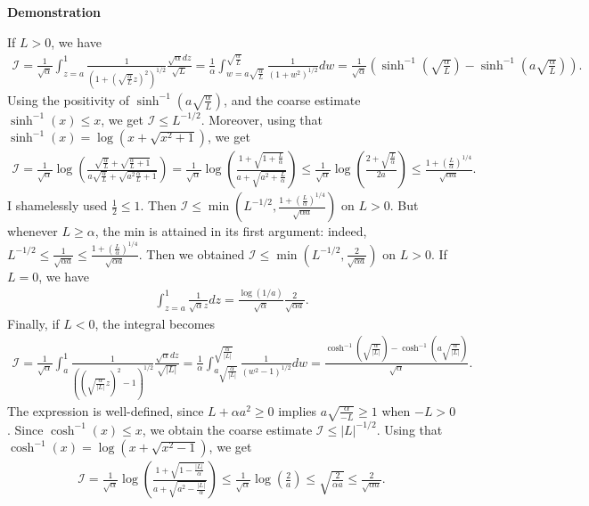 \documentclass{article}
\numberwithin{equation}{section}
\newcommand{\myproof}[1]{
	\noindent \textbf{Demonstration}
	{\small	#1 \hfill \qedsymbol}
}
\newcommand{\intern}[1]{{\color{RoyalBlue} #1}} %
\begin{document}
\myproof{
	If $L>0$, we have
	\begin{align*}
		\mathcal{I} = \frac{1}{\sqrt{\alpha}} \int_{z=a}^1 \frac{1}{\left(1 + \left(\sqrt{\frac{\alpha}{L}} z\right)^2\right)^{1/2}} \frac{\sqrt{\alpha} dz}{\sqrt{L}}
		= \frac{1}{\alpha} \int_{w=a \sqrt{\frac{\alpha}{L}}}^{\sqrt{\frac{\alpha}{L}}} \frac{1}{\left(1+w^2\right)^{1/2}} dw 
		= \frac{1}{\sqrt{\alpha}} \left(\sinh^{-1}\left(\sqrt{\frac{\alpha}{L}}\right) - \sinh^{-1}\left(a\sqrt{\frac{\alpha}{L}}\right)\right).
	\end{align*}
	Using the positivity of $\sinh^{-1}\left(a\sqrt{\frac{\alpha}{L}}\right)$, and the coarse estimate $\sinh^{-1}(x) \leqslant x$, we get $\mathcal{I} \leqslant L^{-1/2}$. 
	Moreover, using that $\sinh^{-1}(x) = \log(x + \sqrt{x^2 + 1})$, we get
	\begin{align*}
		\mathcal{I} = \frac{1}{\sqrt{\alpha}} \log\left(\frac{\sqrt{\frac{\alpha}{L}} + \sqrt{\frac{\alpha}{L} + 1}}{a\sqrt{\frac{\alpha}{L}} + \sqrt{a^2\frac{\alpha}{L} + 1}}\right)
		= \frac{1}{\sqrt{\alpha}} \log\left(\frac{1 + \sqrt{1 + \frac{L}{\alpha}}}{a + \sqrt{a^2 + \frac{L}{\alpha}}}\right)
		\leqslant \frac{1}{\sqrt{\alpha}} \log\left(\frac{2 + \sqrt{\frac{L}{\alpha}}}{2 a}\right)
		\leqslant \frac{1 + \left(\frac{L}{\alpha}\right)^{1/4}}{\sqrt{\alpha a}}.
	\end{align*}
	\intern{I shamelessly used $\frac{1}{2} \leqslant 1$.} Then $\mathcal{I} \leqslant \min\left(L^{-1/2},\frac{1 + \left(\frac{L}{\alpha}\right)^{1/4}}{\sqrt{\alpha a}}\right)$ on $L>0$. But whenever $L \geqslant \alpha$, the min is attained in its first argument: indeed, $L^{-1/2} \leqslant \frac{1}{\sqrt{\alpha a}} \leqslant \frac{1+\left(\frac{L}{\alpha}\right)^{1/4}}{\sqrt{\alpha a}}$. Then we obtained $\mathcal{I} \leqslant \min(L^{-1/2},\frac{2}{\sqrt{\alpha a}})$ on $L>0$.
	If $L=0$, we have
	\begin{align*}
		\int_{z=a}^1 \frac{1}{\sqrt{\alpha} z} dz = \frac{\log(1/a)}{\sqrt{\alpha}} \frac{2}{\sqrt{\alpha a}}.
	\end{align*}
	Finally, if $L<0$, the integral becomes
	\begin{align*}
		\mathcal{I} = \frac{1}{\sqrt{\alpha}} \int_{a}^1 \frac{1}{\left(\left(\sqrt{\frac{\alpha}{|L|}} z\right)^2-1\right)^{1/2}} \frac{\sqrt{\alpha} dz}{\sqrt{|L|}}
		= \frac{1}{\alpha} \int_{a \sqrt{\frac{\alpha}{|L|}}}^{\sqrt{\frac{\alpha}{|L|}}} \frac{1}{\left(w^2-1\right)^{1/2}} dw 
		= \frac{\cosh^{-1}\left(\sqrt{\frac{\alpha}{|L|}}\right) - \cosh^{-1}\left(a\sqrt{\frac{\alpha}{|L|}}\right)}{\sqrt{\alpha}}.
	\end{align*}
	The expression is well-defined, since $L + \alpha a^2 \geqslant 0$ implies $a \sqrt{\frac{\alpha}{-L}} \geqslant 1$ when $-L>0$.
	Since $\cosh^{-1}(x) \leqslant x$, we obtain the coarse estimate $\mathcal{I} \leqslant |L|^{-1/2}$.
	Using that $\cosh^{-1}(x)=\log\left(x+\sqrt{x^2-1}\right)$, we get
	\begin{align*}
		\mathcal{I} 
		= \frac{1}{\sqrt{\alpha}} \log\left(\frac{1 + \sqrt{1 - \frac{|L|}{\alpha}}}{a + \sqrt{a^2 - \frac{|L|}{\alpha}}}\right) 
		\leqslant \frac{1}{\sqrt{\alpha}} \log\left(\frac{2}{a}\right) 
		\leqslant \sqrt{\frac{2}{\alpha a}}
		\leqslant \frac{2}{\sqrt{\alpha a}}.
	\end{align*}
	
}
\end{document}
